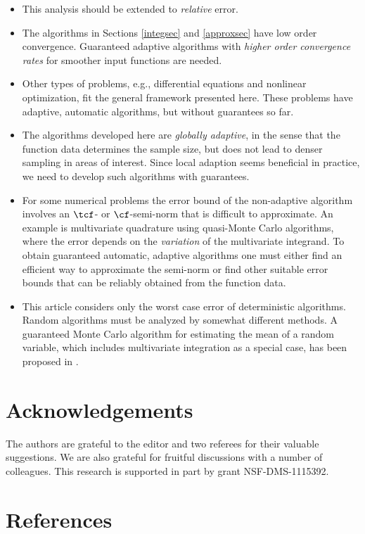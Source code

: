 \documentclass[]{elsarticle}
\theoremstyle{definition}
\theoremstyle{remark}
\begin{document}
\begin{itemize}

\item This analysis should be extended to \emph{relative} error.  

\item The algorithms in Sections \ref{integsec} and \ref{approxsec} have low order convergence.  Guaranteed adaptive algorithms with \emph{higher order convergence rates} for smoother input functions are needed.

\item Other types of problems, e.g., differential equations and nonlinear optimization, fit the general framework presented here.  These problems have adaptive, automatic algorithms, but without guarantees so far.

\item The algorithms developed here are \emph{globally adaptive}, in the sense that the function data determines the sample size, but does not lead to denser sampling in areas of interest.  Since local adaption seems beneficial in practice, we need to develop such algorithms with guarantees.

\item For some numerical problems the error bound of the non-adaptive algorithm involves an $\tcf$- or $\cf$-semi-norm that is difficult to approximate.  An example is multivariate quadrature using quasi-Monte Carlo algorithms, where the error depends on the \emph{variation} of the multivariate integrand.  To obtain guaranteed automatic, adaptive algorithms one must either find an efficient way to approximate the semi-norm or find other suitable error bounds that can be reliably obtained from the function data.  

\item This article considers only the worst case error of deterministic algorithms.  Random algorithms must be analyzed by somewhat different methods.  A guaranteed Monte Carlo algorithm for estimating the mean of a random variable, which includes multivariate integration as a special case, has been proposed in \cite{HicEtal14a}.

\end{itemize}

\section{Acknowledgements}  The authors are grateful to the editor and two referees for their valuable suggestions.  We are also grateful for fruitful discussions with a number of colleagues. This research is supported in part by grant NSF-DMS-1115392.

\section*{References}

%

\end{document}

